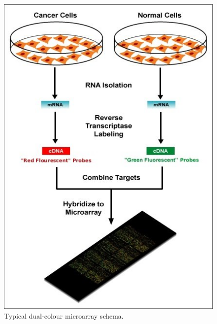 \documentclass[a4paper]{report}
\begin{document}
\begin{figure}[htb] 
\begin{center}
\includegraphics[scale=0.4]{figure/microarraySchema.jpg} 
\end{center}
\caption{Typical dual-colour microarray schema.}
\label{geneExpression}
\end{figure}
\end{document}
